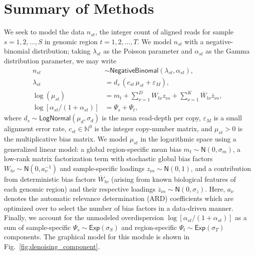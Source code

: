 \documentclass[sigplan]{acmart}\settopmatter{printfolios=true,printccs=false,printacmref=false}
\begin{document}
\section{Summary of Methods}\label{sec:methods}
 We seek to model the data $n_{st}$, the integer count of aligned reads for sample $s=1, 2, \ldots, S$ in genomic region $t=1, 2, \ldots, T$.  We model $n_{st}$ with a negative-binomial distribution; taking $\lambda_{st}$ as the Poisson parameter and $\alpha_{st}$ as the Gamma distribution parameter, we may write
\begin{equation}
\begin{split}
n_{st} &\sim \mathsf{NegativeBinomal}(\lambda_{st}, \alpha_{st}),\\
\lambda_{st} &=d_s \, (c_{st} \, \mu_{st}  + \varepsilon_M),\\
\log(\mu_{st}) &= m_t + \sum_{\nu=1}^{D} W_{t\nu} z_{\nu s} + \sum_{\nu=1}^{K} \overline{W}_{t\nu} \overline{z}_{\nu s},\\
\log[\alpha_{st}/(1+ \alpha_{st})] &=\Psi_s + \Psi_t,
\end{split}
\end{equation}
where $d_s \sim \mathsf{LogNormal}(\mu_d, \sigma_d)$ is the mean read-depth per copy, $\varepsilon_M$ is a small alignment error rate, $c_{st} \in \mathbb{N}^0$ is the integer copy-number matrix, and $\mu_{st} > 0$ is the multiplicative bias matrix. We model $\mu_{st}$ in the logarithmic space using a generalized linear model: a global region-specific mean bias $m_t \sim \mathsf{N}(0, \sigma_m)$, a low-rank matrix factorization term with stochastic global bias factors $W_{t\nu} \sim \mathsf{N}(0, a_\nu^{-1})$ and sample-specific loadings $z_{\nu s} \sim \mathsf{N}(0, 1)$, and a contribution from deterministic bias factors $\overline{W}_{t\nu}$ (arising from known biological features of each genomic region) and their respective loadings $\overline{z}_{\nu s} \sim \mathsf{N}(0, \sigma_z)$. Here, $a_\nu$ denotes the automatic relevance determination (ARD) coefficients which are optimized over to select the number of bias factors in a data-driven manner. Finally, we account for the unmodeled overdispersion $\log[\alpha_{st}/(1+ \alpha_{st})]$ as a sum of sample-specific $\Psi_s \sim \mathsf{Exp}(\sigma_S)$ and region-specific $\Psi_t \sim \mathsf{Exp}(\sigma_T)$ components. The graphical model for this module is shown in Fig.~\ref{fig:denoising_component}.\\
\end{document}
